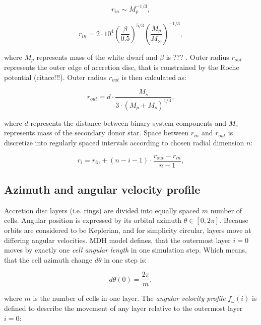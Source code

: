 \begin{equation}
    r_{in} \sim M_p^{-1/3},
\end{equation}

\begin{equation}
	r_{in} = 2 \cdot 10^{4} \left(\frac{\beta}{0.5}\right)^{5/3} \left(\frac{M_p}{M_{\odot}}\right)^{-1/3},
\end{equation}

where $M_p$ represents mass of the white dwarf and $\beta$ is ??? . Outer radius $r_{out}$ represents the outer edge of accretion disc, that is constrained by the Roche potential (citace!!!). Outer radius $r_{out}$ is then calculated as:

\begin{equation}
    r_{out} = d \cdot \frac{M_{s}}{3 \cdot (M_p+M_{s})^{1/3}},
\end{equation}

where $d$ represents the distance between binary system components and $M_s$ represents mass of the secondary donor star. Space between $r_{in}$ and $r_{out}$ is discretize into regularly spaced intervals according to chosen radial dimension $n$:

\begin{equation} \label{eq:cell_radius}
    r_i = r_{in} + (n - i - 1) \cdot \frac{r_{out} - r_{in}}{n - 1},
\end{equation}

\subsection{Azimuth and angular velocity profile}
Accretion disc layers (i.e. rings) are divided into equally spaced $m$ number of cells. Angular position is expressed by its orbital azimuth $\theta \in [0, 2\pi]$. Because orbits are considered to be Keplerian, and for simplicity circular, layers move at differing angular velocities. MDH model defines, that the outermost layer $i = 0$ moves by exactly one \emph{cell angular length} in one simulation step. Which means, that the cell azimuth change $d\theta$ in one step is:

\begin{equation} \label{eq:outer_azm_change}
d\theta(0) = \frac{2\pi}{m},
\end{equation}

where $m$ is the number of cells in one layer. The \emph{angular velocity profile} $f_{\omega}(i)$ is defined to describe the movement of any layer relative to the outermost layer $i=0$: 

